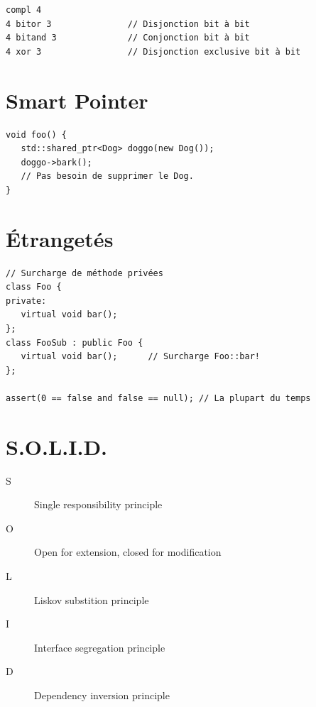 \documentclass{article}
\begin{document}
\begin{multicols*}{3}
\begin{lstlisting}
compl 4
4 bitor 3               // Disjonction bit à bit
4 bitand 3              // Conjonction bit à bit
4 xor 3                 // Disjonction exclusive bit à bit
\end{lstlisting}

\section*{Smart Pointer}

\begin{lstlisting}
void foo() {
   std::shared_ptr<Dog> doggo(new Dog());
   doggo->bark();
   // Pas besoin de supprimer le Dog.
}

\end{lstlisting}

\section*{Étrangetés}

\begin{lstlisting}
// Surcharge de méthode privées
class Foo {
private:
   virtual void bar();
};
class FooSub : public Foo {
   virtual void bar();      // Surcharge Foo::bar!
};

assert(0 == false and false == null); // La plupart du temps
\end{lstlisting}

\section*{S.O.L.I.D.}
\begin{description}
\item[S] Single responsibility principle
\item[O] Open for extension, closed for modification
\item[L] Liskov substition principle
\item[I] Interface segregation principle
\item[D] Dependency inversion principle
\end{description}

\end{multicols*}
\end{document}
